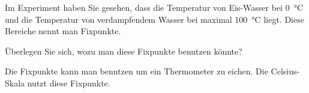 \begin{aufgabe}
Im Experiment haben Sie gesehen, dass die Temperatur von Eis-Wasser bei \SI{0}{\celsius} und die
Temperatur von verdampfendem Wasser bei maximal \SI{100}{\celsius} liegt.
Diese Bereiche nennt man Fixpunkte.

Überlegen Sie sich, wozu man diese Fixpunkte benutzen könnte?
\begin{loesung}
Die Fixpunkte kann man benutzen um ein Thermometer zu eichen.
Die Celsius-Skala nutzt diese Fixpunkte.
\end{loesung}

\end{aufgabe}
